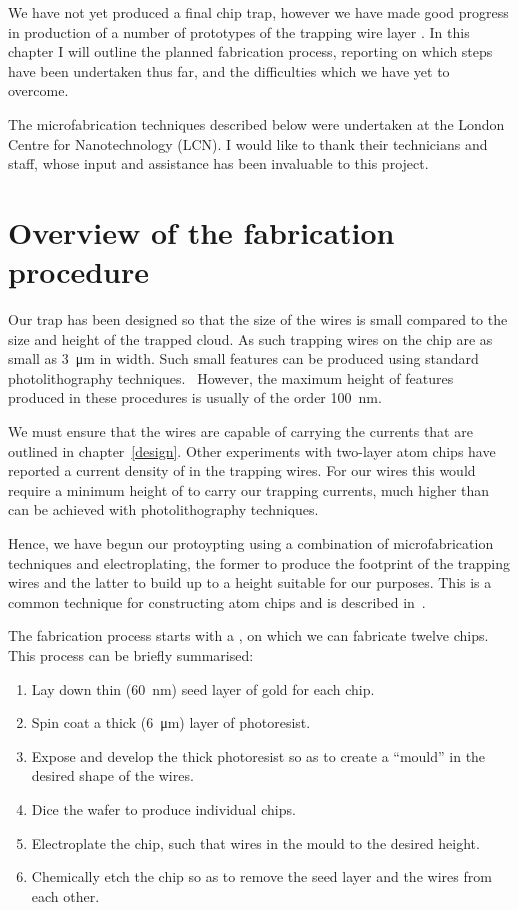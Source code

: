 We have not yet produced a final chip trap, however we have made good progress
in production of a number of prototypes of the trapping wire layer . In this chapter I will outline the
planned fabrication process, reporting on which steps have been undertaken thus
far, and the difficulties which we have yet to overcome.

The microfabrication techniques described below were undertaken at the London
Centre for Nanotechnology (LCN). I would like to thank their technicians and
staff, whose input and assistance has been invaluable to this project.

\section{Overview of the fabrication procedure}

Our trap has been designed so that the size of the wires is small compared to
the size and height of the trapped cloud. As such trapping wires on the chip
are as small as \SI{3}{\micro\meter} in width. Such small features can be
produced using standard photolithography techniques.~\cite{Madou2002} However,
the maximum height of features produced in these procedures is usually of the
order \SI{100}{\nano\meter}.

We must ensure that the wires are capable of carrying the currents that are
outlined in chapter~\ref{design}.  Other experiments with two-layer atom chips
have reported a current density of  in the trapping wires. For our wires
this would require a minimum height of  to carry our trapping
currents, much higher than can be achieved with photolithography techniques.

Hence, we have begun our protoypting using a combination of microfabrication
techniques and electroplating, the former to produce the footprint of the
trapping wires and the latter to build up to a height suitable for our
purposes. This is a common technique for constructing atom chips and is
described in~\cite{2011Ac, Lev2003}.

The fabrication process starts with a ,
on which we can fabricate twelve  chips. This process can be
briefly summarised:
\begin{enumerate}
\item Lay down thin (\SI{60}{\nano\meter}) seed layer of gold for each chip.
\item Spin coat a thick (\SI{6}{\micro\meter}) layer of photoresist.
\item Expose and develop the thick photoresist so as to create a ``mould''
in the desired shape of the wires.
\item Dice the wafer to produce individual chips.
\item Electroplate the chip, such that wires  in the mould to the
desired height.
\item Chemically etch the chip so as to remove the seed layer and
   the wires from each other.
\end{enumerate}

